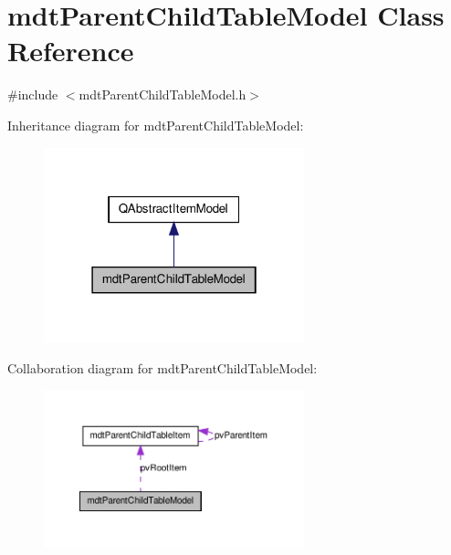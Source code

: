 \hypertarget{classmdt_parent_child_table_model}{\section{mdt\-Parent\-Child\-Table\-Model Class Reference}
\label{classmdt_parent_child_table_model}
}


{\ttfamily \#include $<$mdt\-Parent\-Child\-Table\-Model.\-h$>$}



Inheritance diagram for mdt\-Parent\-Child\-Table\-Model\-:\nopagebreak
\begin{figure}[H]
\begin{center}
\leavevmode
\includegraphics[width=214pt]{classmdt_parent_child_table_model__inherit__graph}
\end{center}
\end{figure}


Collaboration diagram for mdt\-Parent\-Child\-Table\-Model\-:\nopagebreak
\begin{figure}[H]
\begin{center}
\leavevmode
\includegraphics[width=214pt]{classmdt_parent_child_table_model__coll__graph}
\end{center}
\end{figure}
